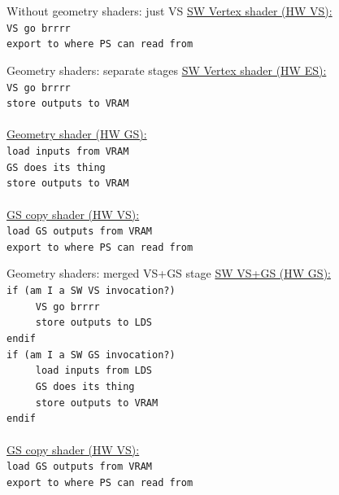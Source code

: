 \documentclass[aspectratio=169,t,xcolor=table]{beamer}
\begin{document}
\begin{frame}{Without geometry shaders: just VS}
    \footnotesize
    \underline{SW Vertex shader (HW VS):}
    \normalsize \texttt{\\
        VS go brrrr \\
        export to where PS can read from
    }
\end{frame}

\begin{frame}{Geometry shaders: separate stages}
    \footnotesize
    \underline{SW Vertex shader (HW ES):}
    \normalsize \texttt{\\
        VS go brrrr \\
        store outputs to VRAM
    }
    \footnotesize
    \ \\
    \ \\
    \underline{Geometry shader (HW GS):}
    \normalsize \texttt {\\
        load inputs from VRAM \\
        GS does its thing \\
        store outputs to VRAM
    }
    \footnotesize
    \ \\
    \ \\
    \underline{GS copy shader (HW VS):}
    \normalsize \texttt {\\
        load GS outputs from VRAM \\
        export to where PS can read from
    }
\end{frame}

\begin{frame}{Geometry shaders: merged VS+GS stage}
    \footnotesize \underline{SW VS+GS (HW GS):}
    \normalsize \texttt{\\
        if (am I a SW VS invocation?) \\
        ~~~~ VS go brrrr \\
        ~~~~ store outputs to LDS \\
        endif \\
        if (am I a SW GS invocation?) \\
        ~~~~ load inputs from LDS \\
        ~~~~ GS does its thing \\
        ~~~~ store outputs to VRAM \\
        endif
    }
    \footnotesize
    \ \\
    \ \\
    \underline{GS copy shader (HW VS):}
    \normalsize \texttt {\\
        load GS outputs from VRAM \\
        export to where PS can read from
    }
\end{frame}
\end{document}
